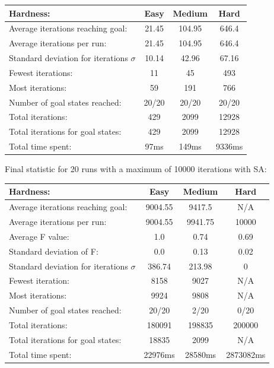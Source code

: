 \documentclass[12pt, a4paper]{article}
\begin{document}
\begin{center}
  \begin{tabular}{| l | c c c|}
    \hline
    Hardness: &\textbf{Easy} & \textbf{Medium} & \textbf{Hard} \\ \hline
    Average iterations reaching goal: & 21.45& 104.95& 646.4\\
    Average iterations per run:  & 21.45 & 104.95 &  646.4\\
    Standard deviation for iterations $\sigma$ & 10.14 & 42.96 & 67.16\\
    Fewest iterations: & 11 & 45& 493\\ 
    Most iterations: & 59 & 191& 766\\ 
    Number of goal states reached: & 20/20 & 20/20 & 20/20\\
    Total iterations: & 429 & 2099& 12928\\
    Total iterations for goal states: & 429 & 2099& 12928\\
    Total time spent: & 97ms& 149ms & 9336ms\\
    \hline
  \end{tabular}
\end{center}
Final statistic for 20 runs with a maximum of 10000 iterations with SA: \\
\begin{center}
  \begin{tabular}{| l | c c c|}
    \hline
    Hardness: &\textbf{Easy} & \textbf{Medium} & \textbf{Hard} \\ \hline
    Average iterations reaching goal: & 9004.55& 9417.5 & N/A\\
    Average iterations per run:  & 9004.55 & 9941.75 &  10000\\
    Average F value: & 1.0 & 0.74 & 0.69\\
    Standard deviation of F: & 0.0 & 0.13& 0.02\\
    Standard deviation for iterations $\sigma$ & 386.74 & 213.98 & 0\\
    Fewest iteration: & 8158 & 9027& N/A\\ 
    Most iterations: & 9924 & 9808& N/A\\ 
    Number of goal states reached: & 20/20 & 2/20 & 0/20\\
    Total iterations: & 180091 & 198835& 200000\\
    Total iterations for goal states: & 18835 & 2099& N/A\\
    Total time spent: & 22976ms & 28580ms & 2873082ms\\
    \hline
  \end{tabular}
\end{center}
\end{document}
